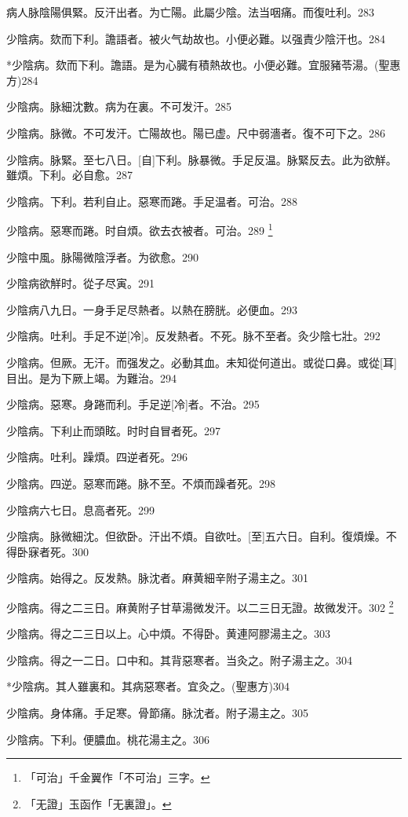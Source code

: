 \documentclass[12pt,oneside,UTF8,b5paper]{ctexbook}她她她她她她她
\begin{document}
病人脉陰陽俱緊。反汗出者。为亡陽。此屬少陰。法当咽痛。而復吐利。283

少陰病。欬而下利。譫語者。被火气劫故也。小便必難。以强責少陰汗也。284

*少陰病。欬而下利。譫語。是为心臓有積熱故也。小便必難。宜服豬苓湯。(聖惠方)284

少陰病。脉細沈數。病为在裏。不可发汗。285

少陰病。脉微。不可发汗。亡陽故也。陽已虚。尺中弱濇者。復不可下之。286

少陰病。脉緊。至七八日。[自]下利。脉暴微。手足反温。脉緊反去。此为欲觧。雖煩。下利。必自愈。287

少陰病。下利。若利自止。惡寒而踡。手足温者。可治。288

少陰病。惡寒而踡。时自煩。欲去衣被者。可治。289
	\footnote{「可治」千金翼作「不可治」三字。}

少陰中風。脉陽微陰浮者。为欲愈。290

少陰病欲觧时。從子尽寅。291

少陰病八九日。一身手足尽熱者。以熱在膀胱。必便血。293

少陰病。吐利。手足不逆[冷]。反发熱者。不死。脉不至者。灸少陰七壯。292

少陰病。但厥。无汗。而强发之。必動其血。未知從何道出。或從口鼻。或從[耳]目出。是为下厥上竭。为難治。294

少陰病。惡寒。身踡而利。手足逆[冷]者。不治。295

少陰病。下利止而頭眩。时时自冒者死。297

少陰病。吐利。躁煩。四逆者死。296

少陰病。四逆。惡寒而踡。脉不至。不煩而躁者死。298

少陰病六七日。息高者死。299

少陰病。脉微細沈。但欲卧。汗出不煩。自欲吐。[至]五六日。自利。復煩燥。不得卧寐者死。300

少陰病。始得之。反发熱。脉沈者。麻黄細辛附子湯主之。301

少陰病。得之二三日。麻黄附子甘草湯微发汗。以二三日无證。故微发汗。302
	\footnote{「无證」玉函作「无裏證」。}

少陰病。得之二三日以上。心中煩。不得卧。黄連阿膠湯主之。303

少陰病。得之一二日。口中和。其背惡寒者。当灸之。附子湯主之。304

*少陰病。其人雖裏和。其病惡寒者。宜灸之。(聖惠方)304

少陰病。身体痛。手足寒。骨節痛。脉沈者。附子湯主之。305

少陰病。下利。便膿血。桃花湯主之。306
\end{document}
